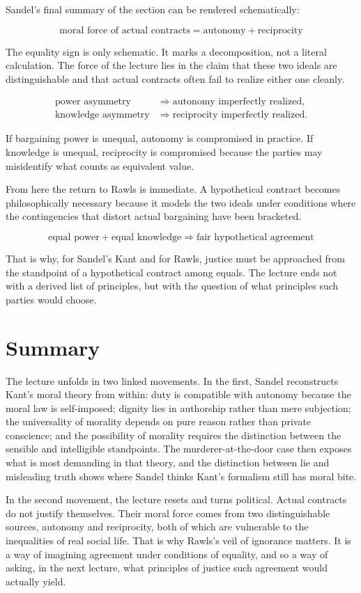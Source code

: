 Sandel's final summary of the section can be rendered schematically:

\begin{equation}
\text{moral force of actual contracts} = \text{autonomy} + \text{reciprocity}
\end{equation}

The equality sign is only schematic. It marks a decomposition, not a literal calculation. The force of the lecture lies in the claim that these two ideals are distinguishable and that actual contracts often fail to realize either one cleanly.

\begin{align}
\text{power asymmetry} &\Longrightarrow \text{autonomy imperfectly realized}, \\
\text{knowledge asymmetry} &\Longrightarrow \text{reciprocity imperfectly realized}.
\end{align}

If bargaining power is unequal, autonomy is compromised in practice. If knowledge is unequal, reciprocity is compromised because the parties may misidentify what counts as equivalent value.

From here the return to Rawls is immediate. A hypothetical contract becomes philosophically necessary because it models the two ideals under conditions where the contingencies that distort actual bargaining have been bracketed.

\begin{equation}
\text{equal power} + \text{equal knowledge} \Longrightarrow \text{fair hypothetical agreement}
\end{equation}

That is why, for Sandel's Kant and for Rawls, justice must be approached from the standpoint of a hypothetical contract among equals. The lecture ends not with a derived list of principles, but with the question of what principles such parties would choose.

\section{Summary}

The lecture unfolds in two linked movements. In the first, Sandel reconstructs Kant's moral theory from within: duty is compatible with autonomy because the moral law is self-imposed; dignity lies in authorship rather than mere subjection; the universality of morality depends on pure reason rather than private conscience; and the possibility of morality requires the distinction between the sensible and intelligible standpoints. The murderer-at-the-door case then exposes what is most demanding in that theory, and the distinction between lie and misleading truth shows where Sandel thinks Kant's formalism still has moral bite.

In the second movement, the lecture resets and turns political. Actual contracts do not justify themselves. Their moral force comes from two distinguishable sources, autonomy and reciprocity, both of which are vulnerable to the inequalities of real social life. That is why Rawls's veil of ignorance matters. It is a way of imagining agreement under conditions of equality, and so a way of asking, in the next lecture, what principles of justice such agreement would actually yield.